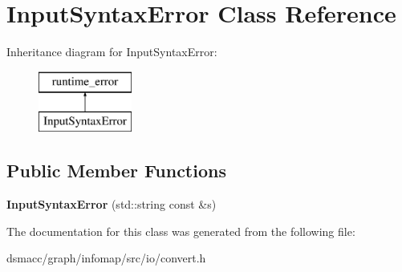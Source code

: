 \hypertarget{classInputSyntaxError}{}\section{Input\+Syntax\+Error Class Reference}
\label{classInputSyntaxError}
Inheritance diagram for Input\+Syntax\+Error\+:\begin{figure}[H]
\begin{center}
\leavevmode
\includegraphics[height=2.000000cm]{classInputSyntaxError}
\end{center}
\end{figure}
\subsection*{Public Member Functions}
\begin{DoxyCompactItemize}
\item 
\mbox{\label{classInputSyntaxError_a2638f49945cb5c009838a13d4d410a01}} 
{\bfseries Input\+Syntax\+Error} (std\+::string const \&s)
\end{DoxyCompactItemize}


The documentation for this class was generated from the following file\+:\begin{DoxyCompactItemize}
\item 
dsmacc/graph/infomap/src/io/convert.\+h\end{DoxyCompactItemize}
